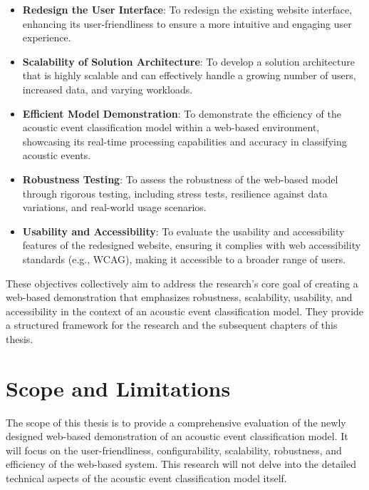 \begin{itemize}
  \item \textbf{Redesign the User Interface}: To redesign the existing website interface, enhancing its user-friendliness to ensure a more intuitive and engaging user experience.
  \item \textbf{Scalability of Solution Architecture}: To develop a solution architecture that is highly scalable and can effectively handle a growing number of users, increased data, and varying workloads.
  \item \textbf{Efficient Model Demonstration}: To demonstrate the efficiency of the acoustic event classification model within a web-based environment, showcasing its real-time processing capabilities and accuracy in classifying acoustic events.
  \item \textbf{Robustness Testing}: To assess the robustness of the web-based model through rigorous testing, including stress tests, resilience against data variations, and real-world usage scenarios.
  \item \textbf{Usability and Accessibility}: To evaluate the usability and accessibility features of the redesigned website, ensuring it complies with web accessibility standards (e.g., WCAG), making it accessible to a broader range of users.
\end{itemize}

These objectives collectively aim to address the research's core goal of creating a web-based demonstration that emphasizes robustness, scalability, usability, and accessibility in the context of an acoustic event classification model. They provide a structured framework for the research and the subsequent chapters of this thesis.

\section{Scope and Limitations}

The scope of this thesis is to provide a comprehensive evaluation of the newly designed web-based demonstration of an acoustic event classification model. It will focus on the user-friendliness, configurability, scalability, robustness, and efficiency of the web-based system. This research will not delve into the detailed technical aspects of the acoustic event classification model itself.

